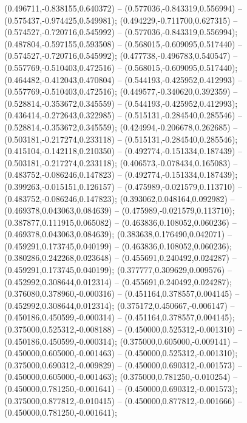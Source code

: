  (0.496711,-0.838155,0.640372) -- (0.577036,-0.843319,0.556994) -- (0.575437,-0.974425,0.549981);
 (0.494229,-0.711700,0.627315) -- (0.574527,-0.720716,0.545992) -- (0.577036,-0.843319,0.556994);
 (0.487804,-0.597155,0.593508) -- (0.568015,-0.609095,0.517440) -- (0.574527,-0.720716,0.545992);
 (0.477738,-0.496783,0.540547) -- (0.557769,-0.510403,0.472516) -- (0.568015,-0.609095,0.517440);
 (0.464482,-0.412043,0.470804) -- (0.544193,-0.425952,0.412993) -- (0.557769,-0.510403,0.472516);
 (0.449577,-0.340620,0.392359) -- (0.528814,-0.353672,0.345559) -- (0.544193,-0.425952,0.412993);
 (0.436414,-0.272643,0.322985) -- (0.515131,-0.284540,0.285546) -- (0.528814,-0.353672,0.345559);
 (0.424994,-0.206678,0.262685) -- (0.503181,-0.217274,0.233118) -- (0.515131,-0.284540,0.285546);
 (0.415104,-0.142118,0.210350) -- (0.492774,-0.151334,0.187439) -- (0.503181,-0.217274,0.233118);
 (0.406573,-0.078434,0.165083) -- (0.483752,-0.086246,0.147823) -- (0.492774,-0.151334,0.187439);
 (0.399263,-0.015151,0.126157) -- (0.475989,-0.021579,0.113710) -- (0.483752,-0.086246,0.147823);
 (0.393062,0.048164,0.092982) -- (0.469378,0.043063,0.084639) -- (0.475989,-0.021579,0.113710);
 (0.387877,0.111915,0.065082) -- (0.463836,0.108052,0.060236) -- (0.469378,0.043063,0.084639);
 (0.383638,0.176490,0.042071) -- (0.459291,0.173745,0.040199) -- (0.463836,0.108052,0.060236);
 (0.380286,0.242268,0.023648) -- (0.455691,0.240492,0.024287) -- (0.459291,0.173745,0.040199);
 (0.377777,0.309629,0.009576) -- (0.452992,0.308644,0.012314) -- (0.455691,0.240492,0.024287);
 (0.376080,0.378960,-0.000316) -- (0.451164,0.378557,0.004145) -- (0.452992,0.308644,0.012314);
 (0.375172,0.450667,-0.006147) -- (0.450186,0.450599,-0.000314) -- (0.451164,0.378557,0.004145);
 (0.375000,0.525312,-0.008188) -- (0.450000,0.525312,-0.001310) -- (0.450186,0.450599,-0.000314);
 (0.375000,0.605000,-0.009141) -- (0.450000,0.605000,-0.001463) -- (0.450000,0.525312,-0.001310);
 (0.375000,0.690312,-0.009829) -- (0.450000,0.690312,-0.001573) -- (0.450000,0.605000,-0.001463);
 (0.375000,0.781250,-0.010254) -- (0.450000,0.781250,-0.001641) -- (0.450000,0.690312,-0.001573);
 (0.375000,0.877812,-0.010415) -- (0.450000,0.877812,-0.001666) -- (0.450000,0.781250,-0.001641);
